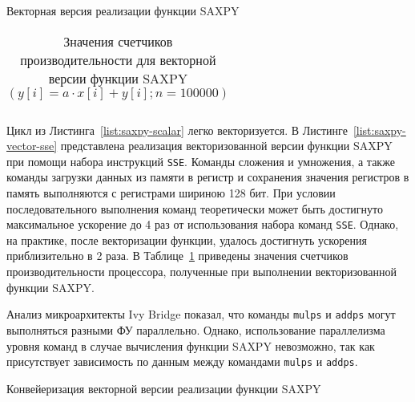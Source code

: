 \begin{ListingEnv}[!ht]
	
	
    \caption{Векторная версия реализации функции SAXPY}
    \label{list:saxpy-vector-sse}
\end{ListingEnv}

\begin{table} [!h]
  \centering
  \captionsetup{width=15cm}
  \caption{Значения счетчиков производительности для векторной версии функции SAXPY
  $(y[i] = a \cdot x[i] + y[i]; n = 100000)$}\label{table:perf-saxpy-vector-sse}%
\begin{tabular}{  | p{0.09\linewidth} | p{0.09\linewidth} | p{0.09\linewidth} |
p{0.13\linewidth} | p{0.09\linewidth} | p{0.09\linewidth} | p{0.09\linewidth} |
p{0.09\linewidth}l | }
\hline
\hline

\hline
\hline
  \end{tabular}
\end{table}

Цикл из Листинга~\ref{list:saxpy-scalar} легко векторизуется. В Листинге~\ref{list:saxpy-vector-sse} представлена реализация векторизованной версии функции SAXPY при помощи набора инструкций \texttt{SSE}. Команды сложения и умножения, а также команды загрузки данных из памяти в регистр и сохранения значения регистров в память выполняются с регистрами шириною 128 бит. При условии последовательного выполнения команд теоретически может быть достигнуто максимальное ускорение до 4 раз от использования набора команд \texttt{SSE}. Однако, на практике, после векторизации функции, удалось достигнуть ускорения приблизительно в 2 раза. В Таблице~\ref{table:perf-saxpy-vector-sse} приведены значения счетчиков производительности процессора, полученные при выполнении векторизованной функции SAXPY.

Анализ микроархитекты Ivy Bridge показал, что команды \texttt{mulps} и \texttt{addps} могут выполняться разными ФУ параллельно. Однако, использование параллелизма уровня команд в случае вычисления функции SAXPY невозможно, так как присутствует зависимость по данным между командами \texttt{mulps} и \texttt{addps}.

\begin{ListingEnv}[!ht]
	
    \caption{Конвейеризация векторной версии реализации функции SAXPY}
    \label{list:saxpy-vector-sse-pipelined}
\end{ListingEnv}

